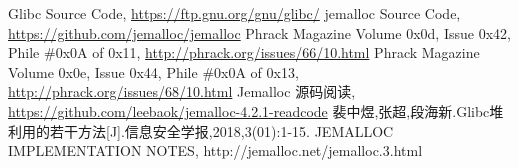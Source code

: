\begin{thebibliography}{}  
 Glibc Source Code, \url{https://ftp.gnu.org/gnu/glibc/}
 jemalloc Source Code, \url{https://github.com/jemalloc/jemalloc}
 Phrack Magazine Volume 0x0d, Issue 0x42, Phile \#0x0A of 0x11, \url{http://phrack.org/issues/66/10.html}
 Phrack Magazine Volume 0x0e, Issue 0x44, Phile \#0x0A of 0x13, \url{http://phrack.org/issues/68/10.html}
 Jemalloc 源码阅读, \url{https://github.com/leebaok/jemalloc-4.2.1-readcode}
 裴中煜,张超,段海新.Glibc堆利用的若干方法[J].信息安全学报,2018,3(01):1-15.
 JEMALLOC IMPLEMENTATION NOTES, http://jemalloc.net/jemalloc.3.html
\end{thebibliography}
